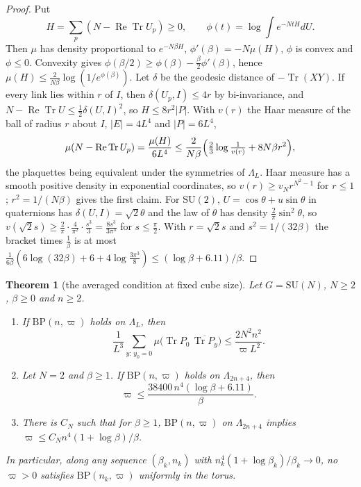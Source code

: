 \documentclass[aps,prd,twocolumn,superscriptaddress,nofootinbib,longbibliography,floatfix,amsmath,amssymb,10pt]{revtex4-2}
\newtheorem{theorem}{Theorem}
\theoremstyle{definition}
\theoremstyle{remark}
\newcommand{\SU}{\mathrm{SU}}
\newcommand{\Tr}{\operatorname{Tr}}
\newcommand{\ReTr}{\operatorname{Re}\operatorname{Tr}}
\begin{document}
\begin{proof}
Put
\[
H=\sum_p(N-\ReTr U_p)\ge0,\qquad\phi(t)=\log\int e^{-NtH}dU .
\]
Then $\mu$ has density proportional to $e^{-N\beta H}$, $\phi'(\beta)=-N\mu
(H)$, $\phi$ is convex and $\phi\le0$. Convexity gives $\phi(\beta/2)\ge\phi(\beta)-\frac
\beta2\phi'(\beta)$, hence $\mu(H)\le\frac2{N\beta}\log(1/e^{\phi(\beta)})$.
Let $\delta$ be the geodesic distance of $-\Tr(XY)$. If every link lies
within $r$ of $I$, then $\delta(U_p,I)\le4r$ by bi-invariance, and $N-
\ReTr U\le\frac12\delta(U,I)^2$, so $H\le8r^2\lvert P\rvert$. With $v(r)$ the
Haar measure of the ball of radius $r$ about $I$, $\lvert E\rvert=4L^4$ and
$\lvert P\rvert=6L^4$,
\[
\mu(N-\ReTr U_p)=\frac{\mu(H)}{6L^4}\le\frac2{N\beta}\Bigl(\tfrac23\log
\tfrac1{v(r)}+8N\beta r^2\Bigr),
\]
the plaquettes being equivalent under the symmetries of $\Lambda_L$. Haar
measure has a smooth positive density in exponential coordinates, so $v(r)
\ge v_Nr^{N^2-1}$ for $r\le1$; $r^2=1/(N\beta)$ gives the first claim. For
$\SU(2)$, $U=\cos\theta+u\sin\theta$ in quaternions has $\delta(U,I)=\sqrt2
\theta$ and the law of $\theta$ has density $\frac2\pi\sin^2\theta$, so
$v(\sqrt2s)\ge\frac2\pi\cdot\frac4{\pi^2}\cdot\frac{s^3}3=\frac{8s^3}{3\pi^3}$
for $s\le\frac\pi2$. With $r=\sqrt2s$ and $s^2=1/(32\beta)$ the bracket
times $\frac1\beta$ is at most $\frac1{6\beta}(6\log(32\beta)+6+4\log
\frac{3\pi^3}8)\le(\log\beta+6.11)/\beta$.
\end{proof}

\begin{theorem}[the averaged condition at fixed cube size]\label{thm:bpfixed}
Let $G=\SU(N)$, $N\ge2$, $\beta\ge0$ and $n\ge2$.
\begin{enumerate}[label=\textup{(\roman*)},leftmargin=*]
\item If $\mathrm{BP}(n,\varpi)$ holds on $\Lambda_L$, then
\[
\frac1{L^3}\sum_{y:\,y_0=0}\mu\bigl(\Tr P_0\,\overline{\Tr P_y}\bigr)\le
\frac{2N^2n^2}{\varpi L^2}.
\]
\item Let $N=2$ and $\beta\ge1$. If $\mathrm{BP}(n,\varpi)$ holds on
$\Lambda_{2n+4}$, then
\[
\varpi\le\frac{38400\,n^4(\log\beta+6.11)}\beta .
\]
\item There is $C_N$ such that for $\beta\ge1$, $\mathrm{BP}(n,\varpi)$ on
$\Lambda_{2n+4}$ implies $\varpi\le C_Nn^4(1+\log\beta)/\beta$.
\end{enumerate}
In particular, along any sequence $(\beta_k,n_k)$ with $n_k^4(1+\log
\beta_k)/\beta_k\to0$, no $\varpi>0$ satisfies $\mathrm{BP}(n_k,\varpi)$
uniformly in the torus.
\end{theorem}
\end{document}
